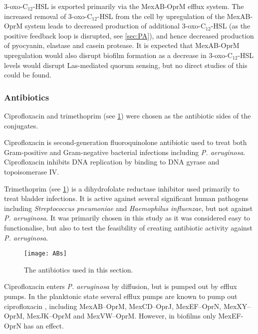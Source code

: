 3-oxo-C$_{12}$-HSL  is exported primarily via the MexAB-OprM efflux system\cite{Evans1998,Poole2004}.
The increased removal of 3-oxo-C$_{12}$-HSL  from the cell by upregulation of the MexAB-OprM system leads to decreased production of additional 3-oxo-C$_{12}$-HSL  (as the positive feedback loop is disrupted, see \ref{sec:PA}), and hence decreased production of pyocyanin, elastase and casein protease. 
It is expected that MexAB-OprM upregulation would also disrupt biofilm formation as a decrease in 3-oxo-C$_{12}$-HSL  levels would disrupt Las-mediated quorum sensing\cite{Davies1998}, but no direct studies of this could be found.


\subsubsection{Antibiotics}

Ciprofloxacin  and trimethoprim  (see \ref{fgr:ABs}) were chosen as the antibiotic sides of the conjugates.
 
Ciprofloxacin  is second-generation fluoroquinolone antibiotic used to treat both Gram-positive and Gram-negative bacterial infections including \textit{P. aeruginosa}\cite{Oliphant2002,Macgowan1999}. Ciprofloxacin  inhibits DNA replication by binding to DNA gyrase and topoisomerase IV\cite{Drlica1997}.


Trimethoprim (see \ref{fgr:ABs}) is a dihydrofolate reductase inhibitor used primarily to treat bladder infections\cite{Brogden1982}. It is active against several significant human pathogens including \textit{Streptococcus pneumoniae} and \textit{Haemophilus influenzae}, but not against \textit{P. aeruginosa}. It was primarily chosen in this study as it was considered easy to functionalise, but also to test the feasibility of creating antibiotic activity against \textit{P. aeruginosa}.

\begin{figure}[H]
	\begin{center}
		\texttt{[image: ABs]}
		\caption{The antibiotics used in this section. \label{fgr:ABs}}
	\end{center}
\end{figure}


Ciprofloxacin  enters \textit{P. aeruginosa} by diffusion\cite{Celesk1989}, but is pumped out by efflux pumps\cite{Poole2000}. In the planktonic state several efflux pumps are known to pump out ciprofloxacin , including MexAB–OprM, MexCD–OprJ, MexEF–OprN, MexXY–OprM, MexJK–OprM and MexVW–OprM\cite{Poole2004}. 
However, in biofilms only MexEF-OprN has an effect\cite{DeKievit2001}.

